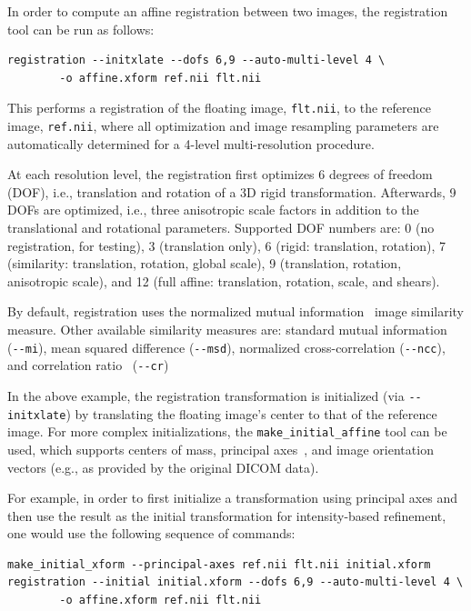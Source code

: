 \documentclass{InsightArticle}
\begin{document}
In order to compute an affine registration between two images, the
registration tool can be run as follows:
\begin{verbatim}
registration --initxlate --dofs 6,9 --auto-multi-level 4 \
        -o affine.xform ref.nii flt.nii
\end{verbatim}
This performs a registration of the floating image, \verb|flt.nii|, to the
reference image, \verb|ref.nii|, where all optimization and image resampling
parameters are automatically determined for a 4-level multi-resolution
procedure. 

At each resolution level, the registration first optimizes 6 degrees of
freedom (DOF), i.e., translation and rotation of a 3D rigid
transformation. Afterwards, 9 DOFs are optimized, i.e., three anisotropic
scale factors in addition to the translational and rotational
parameters. Supported DOF numbers are: 0 (no registration, for testing),
3 (translation only), 6 (rigid: translation, rotation),  7 (similarity:
translation, rotation, global scale), 9 (translation, rotation, anisotropic
scale), and 12 (full affine: translation, rotation, scale, and shears).

By default, registration uses the normalized mutual
information~\cite{StudHillHawk:1999} image similarity measure. Other available
similarity measures are: standard mutual
information~\cite{MaesCollVand:1997,WellViolAtsu:1996} (\verb|--mi|), mean
squared difference (\verb|--msd|), normalized cross-correlation
(\verb|--ncc|), and correlation ratio~\cite{RochMalaPenn:1998a} (\verb|--cr|)

In the above example, the registration transformation is initialized (via
\verb|--initxlate|) by translating the floating image's center to that of the
reference image. For more complex initializations, the
\verb|make_initial_affine| tool can be used, which supports centers of mass,
principal axes~\cite{AlpeBradKenn:1990}, and image orientation vectors (e.g.,
as provided by the original DICOM data).

For example, in order to first initialize a transformation using principal
axes and then use the result as the initial transformation for intensity-based
refinement, one would use the following sequence of commands:
\begin{verbatim}
make_initial_xform --principal-axes ref.nii flt.nii initial.xform
registration --initial initial.xform --dofs 6,9 --auto-multi-level 4 \
        -o affine.xform ref.nii flt.nii
\end{verbatim}
\end{document}
